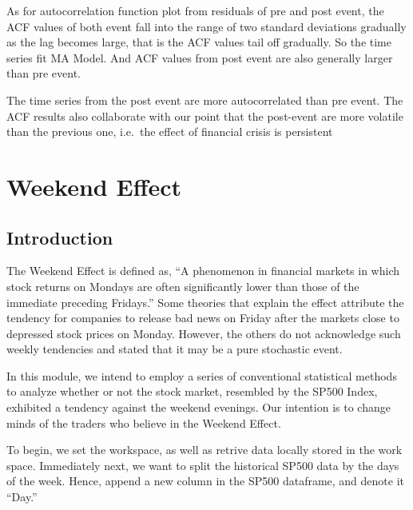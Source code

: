 \documentclass[letterpaper,10pt,english]{/Users/edwsurewin/anaconda/lib/python2.7/site-packages/sphinx/texinputs/sphinxhowto}
\begin{document}
As for autocorrelation function plot from residuals of pre and post
event, the ACF values of both event fall into the range of two standard
deviations gradually as the lag becomes large, that is the ACF values
tail off gradually. So the time series fit MA Model. And ACF values from
post event are also generally larger than pre event.

The time series from the post event are more autocorrelated than pre
event. The ACF results also collaborate with our point that the
post-event are more volatile than the previous one, i.e.~the effect of
financial crisis is persistent\section{Weekend Effect}\label{weekend-effect}\subsection{Introduction}\label{introduction}

The Weekend Effect is defined as, ``A phenomenon in financial markets in
which stock returns on Mondays are often significantly lower than those
of the immediate preceding Fridays.'' Some theories that explain the
effect attribute the tendency for companies to release bad news on
Friday after the markets close to depressed stock prices on Monday.
However, the others do not acknowledge such weekly tendencies and stated
that it may be a pure stochastic event.

In this module, we intend to employ a series of conventional statistical
methods to analyze whether or not the stock market, resembled by the
SP500 Index, exhibited a tendency against the weekend evenings. Our
intention is to change minds of the traders who believe in the Weekend
Effect.

To begin, we set the workspace, as well as retrive data locally stored
in the work space. Immediately next, we want to split the historical
SP500 data by the days of the week. Hence, append a new column in the
SP500 dataframe, and denote it ``Day.''

\end{document}
